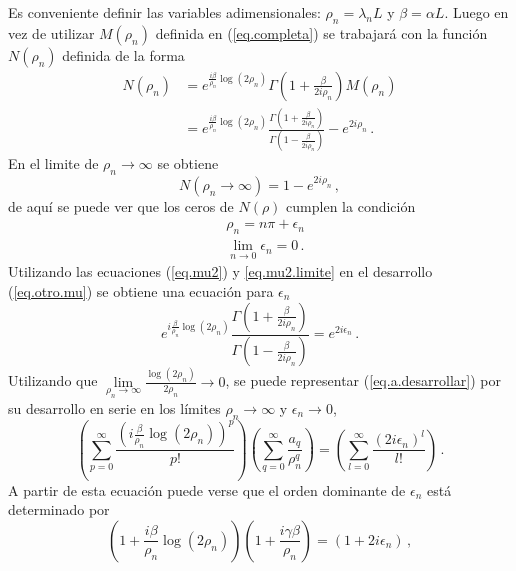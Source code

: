 Es conveniente definir las variables adimensionales: $\rho _n = \lambda _nL $ y $\beta = \alpha L$. Luego en vez de utilizar $M (\rho _n)$ definida en (\ref{eq.completa}) se trabajará con la función $N (\rho _n)$ definida de la forma
\begin{align}
\label{eq.otro.mu}
\nonumber
N (\rho _n) &=
e ^{\frac{i \beta }{\rho _n} \log(2 \rho _n) }
\Gamma \left( 1 + \frac{ \beta}{2 i \rho _n} \right)
M (\rho _n) \\ 
&=  
e ^{\frac{i \beta }{\rho _n} \log(2 \rho _n) }
\frac{\Gamma \left(1 + \frac{ \beta}{2 i \rho _n} \right)}
	{\Gamma \left(1 - \frac{ \beta}{2 i \rho _n} \right)}
- e ^{2 i \rho _n}
\, .
\end{align}
En el limite de $\rho _n \rightarrow \infty$ se obtiene
\begin{equation}
    N(\rho _n  \rightarrow \infty) = 
	1 - e ^{2 i \rho _n}
		\, ,
\end{equation}
de aquí se puede ver que los ceros de $N ( \rho ) $ cumplen la condición
\begin{align}
\label{eq.mu2}
    &\rho _n = n \pi + \epsilon _n \\[5pt]
\label{eq.mu2.limite}
	&\lim \limits _{n \rightarrow{0}} \epsilon _n  = 0
		\, .
\end{align}
Utilizando las ecuaciones (\ref{eq.mu2}) y \eqref{eq.mu2.limite} en el desarrollo (\ref{eq.otro.mu}) se obtiene una ecuación para $\epsilon _n$
\begin{equation}
	e ^{ i \frac{\beta}{ \rho _n} \log (2 \rho _n)}     
    \frac{\Gamma(1 + \frac{ \beta}{2  i \rho _n} ) }
    {\Gamma(1 -  \frac{ \beta}{2  i \rho _n} )} =    
    e ^{2 i \epsilon _n }
    	\, .
\label{eq.a.desarrollar}
\end{equation}
Utilizando que  $ \lim \limits_{\rho _n \rightarrow \infty} \frac{\log (2 \rho _n)}{2 \rho _n } \rightarrow 0$, se puede representar (\ref{eq.a.desarrollar}) por su desarrollo en serie en los límites $ \rho _n \rightarrow \infty $ y $\epsilon _n \rightarrow 0$,
\begin{equation}
    \left(
    \sum _{p = 0} ^{\infty} \frac{ \left( i \frac{\beta}{ \rho _n } \log(2 \rho _n ) \right) ^p }{p!}
    \right)
    \left(
	\sum _{q = 0} ^{\infty} \frac{a _q}{\rho _n ^q}
	\right)
    =
    \left(
    \sum _{l = 0} ^{\infty} \frac{( 2 i \epsilon _n)^l}{l !}
    \right)
    	\, .
\end{equation}
A partir de esta ecuación puede verse que el orden dominante de $\epsilon _n$ está determinado por
\begin{equation}
\left( 1 + \frac{i \beta}{ \rho _n} \log ( 2 \rho _n) \right) 
\left(1 + \frac{i  \gamma \beta}{ \rho _n} \right)  =
(1 + 2 i \epsilon _n) \, ,
\end{equation}
